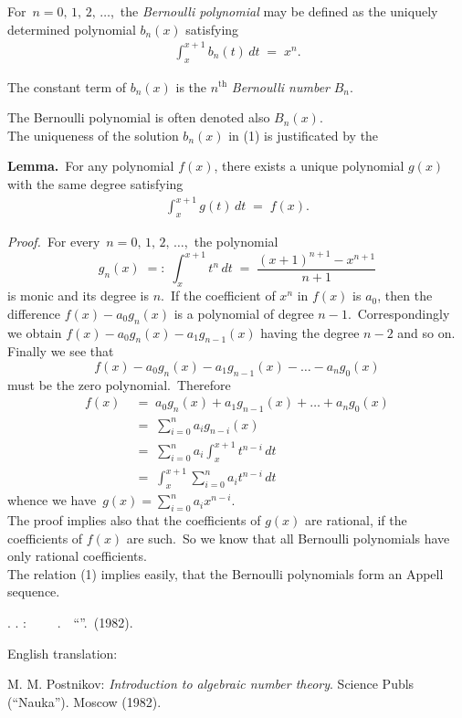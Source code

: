 \documentclass[12pt]{article}
\theoremstyle{definition}
\begin{document}
For\, $n = 0,\,1,\,2,\,\ldots$,\, the {\em Bernoulli polynomial} may be defined as the uniquely determined polynomial $b_n(x)$ satisfying
\begin{align}
\int_x^{x+1}\!b_n(t)\,dt \;=\; x^n.
\end{align}

The constant term of $b_n(x)$ is the $n^{\mathrm{th}}$ {\em Bernoulli number} $B_n$.

The Bernoulli polynomial is often denoted also $B_n(x)$.\\


The uniqueness of the solution $b_n(x)$ in (1) is justificated by the 

\textbf{Lemma.}\, For any polynomial $f(x)$, there exists a unique polynomial $g(x)$ with the same degree satisfying
\begin{align}
\int_x^{x+1}\!g(t)\,dt \;=\; f(x).
\end{align}

{\em Proof.}\, For every\, $n = 0,\,1,\,2,\,\ldots$,\, the polynomial
$$g_n(x) \;=:\; \int_x^{x+1}\!t^n\,dt \;=\; \frac{(x\!+\!1)^{n+1}-x^{n+1}}{n\!+\!1}$$
is monic and its degree is $n$.\, If the coefficient of $x^n$ in $f(x)$ is $a_0$, then the difference $f(x)\!-\!a_0g_n(x)$ is a polynomial of degree $n\!-\!1$.\, Correspondingly we obtain $f(x)-a_0g_n(x)-a_1g_{n-1}(x)$ having the degree $n\!-\!2$ and so on.\, Finally we see that 
$$f(x)-a_0g_n(x)-a_1g_{n-1}(x)-\ldots-a_ng_0(x)$$
must be the zero polynomial.\, Therefore
\begin{align*}
f(x) & \;=\; a_0g_n(x)+a_1g_{n-1}(x)+\ldots+a_ng_0(x)\\
     & \;=\; \sum_{i=0}^na_ig_{n-i}(x)\\
     & \;=\; \sum_{i=0}^na_i\int_x^{x+1}t^{n-i}\,dt\\
     & \;=\; \int_x^{x+1}\sum_{i=0}^na_it^{n-i}\,dt
\end{align*}
whence we have\, $\displaystyle g(x) = \sum_{i=0}^na_ix^{n-i}$.\\

The proof implies also that the coefficients of $g(x)$ are rational, if the coefficients of $f(x)$ are such.\, So we know that all Bernoulli polynomials have only rational coefficients.\\


The relation (1) implies easily, that the Bernoulli polynomials form an Appell sequence.


\begin{thebibliography}{7}
 \CYRM. \CYRM. \CYRP\cyro\cyrs\cyrt\cyrn\cyri\cyrk\cyro\cyrv: 
{\em \CYRV\cyrv\cyre\cyrd\cyre\cyrn\cyri\cyre\, \cyrv\, \cyrt\cyre\cyro\cyrr\cyri\cyryu\, \cyra\cyrl\cyrg\cyre\cyrb\cyrr\cyra\cyri\cyrch\cyre\cyrs\cyrk\cyri\cyrh \,
\cyrch\cyri\cyrs\cyre\cyrl}. \,\CYRI\cyrz\cyrd\cyra\cyrt\cyre\cyrl\cyrsftsn\cyrs\cyrt\cyrv\cyro \,
``\CYRN\cyra\cyru\cyrk\cyra''. \CYRM\cyro\cyrs\cyrk\cyrv\cyra \,(1982).
\end{thebibliography}

English translation:

M. M. Postnikov: \emph{Introduction to algebraic number theory}. Science Publs (``Nauka'').
Moscow (1982).
\end{document}
